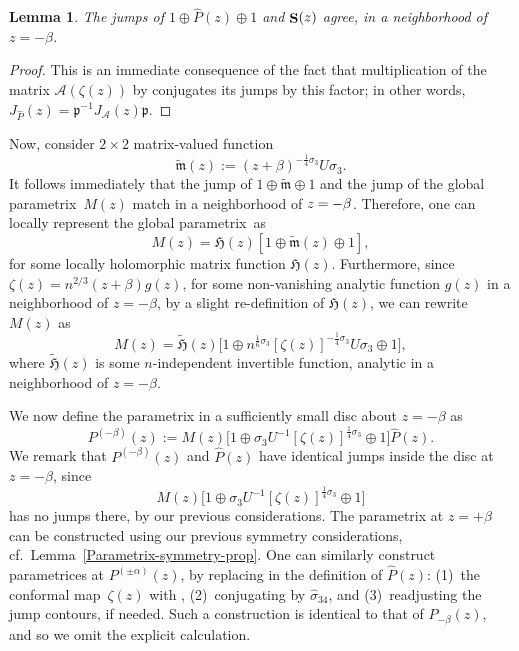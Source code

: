 \documentclass[pdftex]{sigma}
\DeclareMathOperator{\boldS}{{\bf S}}
\numberwithin{equation}{section}
\newtheorem{Lemma}[Theorem]{Lemma}
\begin{document}
\begin{Lemma}
 The jumps of $1\oplus \hat{P}(z) \oplus 1$ and $\boldS(z)$ agree, in a neighborhood of $z=-\beta$.
\end{Lemma}
 \begin{proof}
 This is an immediate consequence of the fact that multiplication of the matrix $\mathcal{A}(\zeta(z))$ by  conjugates its jumps by this factor; in other words, $J_{\hat{P}}(z) = \mathfrak{p}^{-1}J_{\mathcal{A}}(z)\mathfrak{p}$.
 \end{proof}

Now, consider $2\times 2$ matrix-valued function
 \begin{equation*}
 \tilde{\mathfrak{m}}(z) := (z+\beta)^{-\frac{1}{4}\sigma_3} U \sigma_3.
 \end{equation*}
It follows immediately that the jump of $1\oplus \tilde{\mathfrak{m}} \oplus 1$ and the jump of the global parametrix~$M(z)$ match in a neighborhood of $z\hspace{-0.25pt}=\hspace{-0.25pt}-\beta$.
Therefore, one can locally represent the global parametrix~as%
\begin{equation*}
 M(z) = \mathfrak{H}(z) [1\oplus \tilde{\mathfrak{m}}(z) \oplus 1],
\end{equation*}
for some locally holomorphic matrix function $\mathfrak{H}(z)$. Furthermore, since $\zeta(z) = n^{2/3} (z+\beta) g(z)$, for some non-vanishing analytic function $g(z)$ in a neighborhood of $z=-\beta$, by a slight re-definition of $\mathfrak{H}(z)$, we can rewrite $M(z)$ as
 \begin{equation*}
 M(z) = \tilde{\mathfrak{H}}(z) \bigl[1\oplus n^{\frac{1}{6}\sigma_3}[\zeta(z)]^{-\frac{1}{4}\sigma_3} U \sigma_3 \oplus 1 \bigr],
 \end{equation*}
where $\tilde{\mathfrak{H}}(z)$ is some $n$-independent invertible function, analytic in a neighborhood of $z=-\beta$.

We now define the parametrix in a sufficiently small disc about $z=-\beta$ as
 \begin{equation*}
 P^{(-\beta)}(z) := M(z) \bigl[1\oplus \sigma_3 U^{-1}[\zeta(z)]^{\frac{1}{4}\sigma_3} \oplus 1 \bigr] \hat{P}(z).
 \end{equation*}
We remark that $P^{(-\beta)}(z)$ and $\hat{P}(z)$ have identical jumps inside the disc at $z=-\beta$, since
\begin{equation*}
M(z) \bigl[1\oplus \sigma_3 U^{-1}[\zeta(z)]^{\frac{1}{4}\sigma_3} \oplus 1 \bigr]
\end{equation*}
has no jumps there, by our previous considerations. The parametrix at $z=+\beta$ can be constructed using our previous symmetry considerations, cf.\ Lemma~\ref{Parametrix-symmetry-prop}. One can similarly construct parametrices at $P^{(\pm\alpha)}(z)$, by replacing in the definition of $\hat{P}(z)$: (1)~the conformal
map~$\zeta(z)$ with , (2)~conjugating by $\hat{\sigma}_{34}$, and (3)~readjusting the jump contours, if needed. Such a construction is identical to that of $P_{-\beta}(z)$, and so we omit the explicit calculation.
\end{document}
